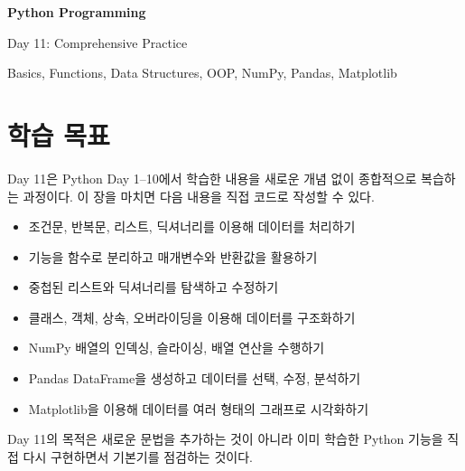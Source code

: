 \documentclass[11pt,a4paper]{article}
\begin{document}
\begin{titlepage}
    \centering
    \vspace*{3cm}

    {\Huge\bfseries Python Programming\par}
    \vspace{0.8cm}
    {\LARGE Day 11: Comprehensive Practice\par}

    \vspace{2cm}

    {\large Basics, Functions, Data Structures, OOP, NumPy, Pandas, Matplotlib\par}

    \vfill
\end{titlepage}

\tableofcontents
\newpage

\section{학습 목표}

\begin{learningbox}
Day 11은 Python Day 1--10에서 학습한 내용을 새로운 개념 없이 종합적으로 복습하는 과정이다.
이 장을 마치면 다음 내용을 직접 코드로 작성할 수 있다.
\begin{itemize}[leftmargin=1.5em]
    \item 조건문, 반복문, 리스트, 딕셔너리를 이용해 데이터를 처리하기
    \item 기능을 함수로 분리하고 매개변수와 반환값을 활용하기
    \item 중첩된 리스트와 딕셔너리를 탐색하고 수정하기
    \item 클래스, 객체, 상속, 오버라이딩을 이용해 데이터를 구조화하기
    \item NumPy 배열의 인덱싱, 슬라이싱, 배열 연산을 수행하기
    \item Pandas DataFrame을 생성하고 데이터를 선택, 수정, 분석하기
    \item Matplotlib을 이용해 데이터를 여러 형태의 그래프로 시각화하기
\end{itemize}
\end{learningbox}

\begin{importantbox}
Day 11의 목적은 새로운 문법을 추가하는 것이 아니라 이미 학습한 Python 기능을 직접 다시 구현하면서 기본기를 점검하는 것이다.
\end{importantbox}
\end{document}
